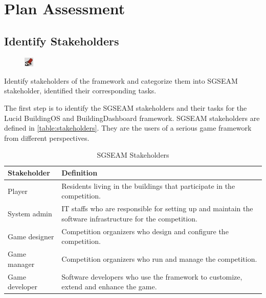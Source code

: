 \documentclass[11pt,oneside]{book}
\newcommand\tabhead[1]{\small\textbf{#1}}
\begin{document}
\chapter{Plan Assessment}

\section{Identify Stakeholders}

\begin{shadebox}
\begin{figure}
\vspace{-15pt}\hspace{-10pt}
    \includegraphics[width=0.04\textwidth]{note-icon}
\end{figure}

Identify stakeholders of the framework and categorize them into SGSEAM stakeholder, identified their 
corresponding tasks.
\end{shadebox}

The first step is to identify the SGSEAM stakeholders and their tasks for the Lucid BuildingOS and BuildingDashboard framework. SGSEAM stakeholders are defined in \autoref{table:stakeholders}. They are the users of a serious game framework from different perspectives.

\begin{table}[ht!]
  \centering
  \begin{tabular}{|p{}|p{}|}
    \hline
    \tabhead{Stakeholder} &
    \tabhead{Definition} \\
    \hline
    Player &
    Residents living in the buildings that participate in the competition.\\
    \hline
    System admin &
    IT staffs who are responsible for setting up and maintain the software infrastructure for the competition. \\
    \hline
    Game designer &
    Competition organizers who design and configure the competition. \\
    \hline
    Game manager &
    Competition organizers who run and manage the competition. \\
    \hline
    Game developer &
    Software developers who use the framework to customize, extend and enhance the game.\\
    \hline
  \end{tabular}
  \caption{SGSEAM Stakeholders}
  \label{table:stakeholders}
\end{table}
\end{document}
